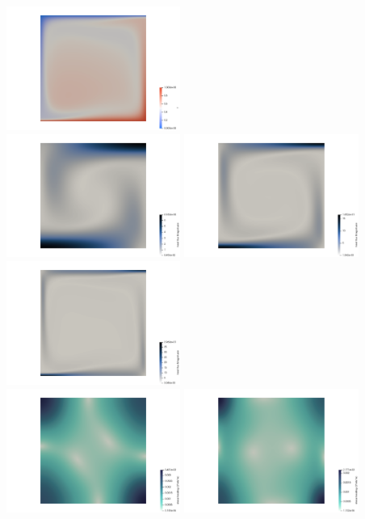\begin{center}
\includegraphics[width=5.7cm]{python_codes/fieldstone_110/results_EBA/T_1e6}\\
\includegraphics[width=5.7cm]{python_codes/fieldstone_110/results_EBA/q_1e4}
\includegraphics[width=5.7cm]{python_codes/fieldstone_110/results_EBA/q_1e5}
\includegraphics[width=5.7cm]{python_codes/fieldstone_110/results_EBA/q_1e6}\\
\includegraphics[width=5.7cm]{python_codes/fieldstone_110/results_EBA/sh_1e4}
\includegraphics[width=5.7cm]{python_codes/fieldstone_110/results_EBA/sh_1e5}

\end{center}
